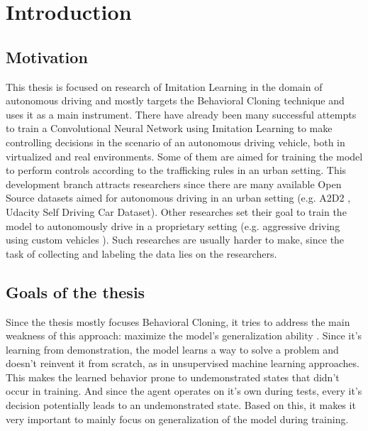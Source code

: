 \chapter{Introduction}
\label{cha:Introduction}

\section{Motivation}

This thesis is focused on research of Imitation Learning in the domain of autonomous driving and mostly targets the Behavioral Cloning technique and uses it as a main instrument. There have already been many successful attempts to train a Convolutional Neural Network using Imitation Learning to make controlling decisions in the scenario of an autonomous driving vehicle, both in virtualized \autocite{8855753} and real \autocite{pan2019agileautonomousdrivingusing} \autocite{bojarski2016endendlearningselfdriving} environments. Some of them are aimed for training the model to perform controls according to the trafficking rules in an urban setting. This development branch attracts researchers since there are many available Open Source datasets aimed for autonomous driving in an urban setting (e.g. A2D2 \autocite{geyer2020a2d2audiautonomousdriving}, Udacity Self Driving Car Dataset). Other researches set their goal to train the model to autonomously drive in a proprietary setting (e.g. aggressive driving using custom vehicles \autocite{drews2017aggressivedeepdrivingmodel}). Such researches are usually harder to make, since the task of collecting and labeling the data lies on the researchers.

\section{Goals of the thesis}

Since the thesis mostly focuses Behavioral Cloning, it tries to address the main weakness of this approach: maximize the model's generalization ability \autocite{ARGALL2009469}. Since it's learning from demonstration, the model learns a way to solve a problem and doesn't reinvent it from scratch, as in unsupervised machine learning approaches. This makes the learned behavior prone to undemonstrated states that didn't occur in training. And since the agent operates on it's own during tests, every it's decision potentially leads to an undemonstrated state. Based on this, it makes it very important to mainly focus on generalization of the model during training.

